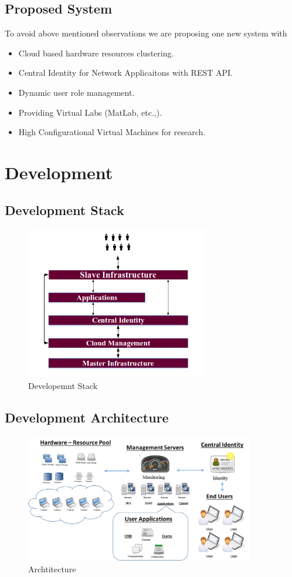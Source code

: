 \documentclass[12pt]{report}
\begin{document}
\section{Proposed System}

	To avoid above mentioned observations we are proposing one new system with 
	\begin{itemize}
		\item Cloud based hardware resources clustering.
		\item Central Identity for Network Applicaitons with REST API.
		\item Dynamic user role management.
		\item Providing Virtual Labs (MatLab, etc.,).
		\item High Configurational Virtual Machines for research.
	\end{itemize}

\chapter{Development}

\section{Development Stack}
\begin{figure}[H]
 \centering
 \includegraphics[width=8cm]{./idea.png}
 \caption{Developemnt Stack\label{fig:Developemnt Stack}}
\end{figure}

\section{Development Architecture}
\begin{figure}[H]
 \centering
 \includegraphics[width=10cm]{./all.png}
 \caption{Archtitecture\label{fig:Archtitecture}}
\end{figure}
\end{document}
